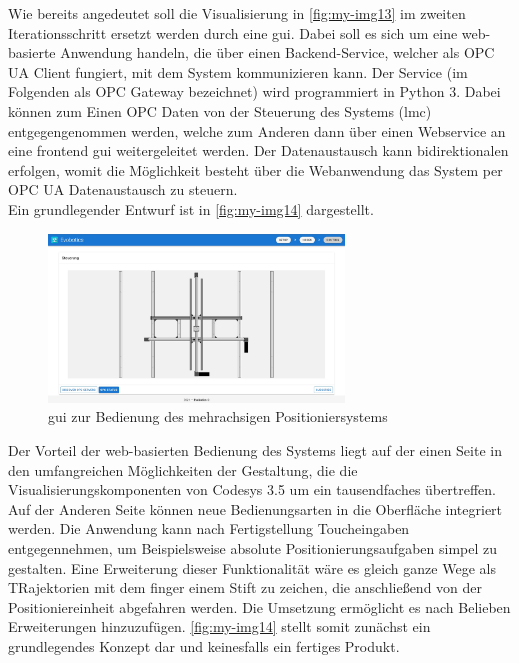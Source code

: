 \documentclass[../../../Bachelorarbeit.tex]{subfiles}
\begin{document}
Wie bereits angedeutet soll die Visualisierung in \autoref{fig:my-img13} im zweiten Iterationsschritt ersetzt werden durch eine \acs{gui}. Dabei soll es sich um eine web-basierte Anwendung handeln, die über einen Backend-Service, welcher als OPC UA Client fungiert, mit dem System kommunizieren kann. Der Service (im Folgenden als OPC Gateway bezeichnet) wird programmiert in Python 3. Dabei können zum Einen OPC Daten von der Steuerung des Systems (\acs{lmc}) entgegengenommen werden, welche zum Anderen dann über einen Webservice an eine frontend \acs{gui} weitergeleitet werden. Der Datenaustausch kann bidirektionalen erfolgen, womit die Möglichkeit besteht über die Webanwendung das System per OPC UA Datenaustausch zu steuern. \\
Ein grundlegender Entwurf ist in \autoref{fig:my-img14} dargestellt.

\begin{figure}[H]
    \centering
    \includegraphics[width=0.7\textwidth]{Images/GUI.jpg}
    \caption[\acs{gui} zur Bedienung]{\acs{gui} zur Bedienung des mehrachsigen Positioniersystems}
    \label{fig:my-img14}
\end{figure}

Der Vorteil der web-basierten Bedienung des Systems liegt auf der einen Seite in den umfangreichen Möglichkeiten der Gestaltung, die die Visualisierungskomponenten von Codesys 3.5 um ein tausendfaches übertreffen. Auf der Anderen Seite können neue Bedienungsarten in die Oberfläche integriert werden. Die Anwendung kann nach Fertigstellung Toucheingaben entgegennehmen, um Beispielsweise absolute Positionierungsaufgaben simpel zu gestalten. Eine Erweiterung dieser Funktionalität wäre es gleich ganze Wege als TRajektorien mit dem finger \bzw einem Stift zu zeichen, die anschließend von der Positioniereinheit abgefahren werden. Die Umsetzung ermöglicht es nach Belieben Erweiterungen hinzuzufügen. \autoref{fig:my-img14} stellt somit zunächst ein grundlegendes Konzept dar und keinesfalls ein fertiges Produkt.
\end{document}
